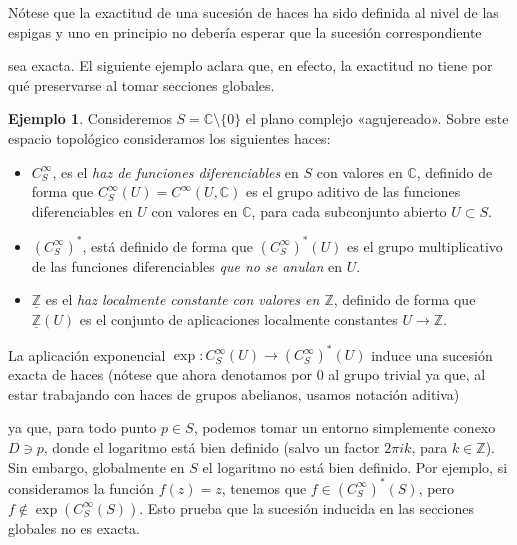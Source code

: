 \documentclass[autocontact]{gaceta}
\theoremstyle{definition} \newtheorem{defn}[thm]{Definición}
\theoremstyle{definition} \newtheorem{ejemplo}[thm]{Ejemplo}
\theoremstyle{definition} \newtheorem{ejercicio}[thm]{Ejercicio}
\def\CC{\mathbb{C}}
\def\FF{\mathscr{F}}
\def\GG{\mathscr{G}}
\def\HH{\mathscr{H}}
\begin{document}
      Nótese que la exactitud de una sucesión de haces ha sido definida al nivel de las espigas y uno en principio no debería esperar que la sucesión correspondiente
      \begin{center}
      \end{center}
      sea exacta. El siguiente ejemplo aclara que, en efecto, la exactitud no tiene por qué preservarse al tomar secciones globales.

    \begin{ejemplo}
      Consideremos $S=\CC\setminus \{0\}$ el plano complejo «agujereado». Sobre este espacio topológico consideramos los siguientes haces:
      \begin{itemize}
	\item $C^\infty_S$, es el \emph{haz de funciones diferenciables} en $S$ con valores en $\CC$, definido de forma que $C^\infty_S(U)=C^\infty(U,\CC)$ es el grupo aditivo de las funciones diferenciables en $U$ con valores en $\CC$, para cada subconjunto abierto $U\subset S$.
	\item $(C^\infty_S)^*$, está definido de forma que $(C^\infty_S)^*(U)$ es el grupo multiplicativo de las funciones diferenciables \emph{que no se anulan} en $U$.
	\item $\underline{\mathbb{Z}}$ es el \emph{haz localmente constante con valores en $\mathbb{Z}$}, definido de forma que $\underline{\mathbb{Z}}(U)$ es el conjunto de aplicaciones localmente constantes $U\rightarrow \mathbb{Z}$.
      \end{itemize}
      La aplicación exponencial $\exp:C^\infty_S(U) \rightarrow (C^\infty_S)^*(U)$ induce una sucesión exacta de haces (nótese que ahora denotamos por $0$ al grupo trivial ya que, al estar trabajando con haces de grupos abelianos, usamos notación aditiva)
      \begin{center}
      \end{center}
      ya que, para todo punto $p\in S$, podemos tomar un entorno simplemente conexo $D\ni p$, donde el logaritmo está bien definido (salvo un factor $2\pi i k$, para $k\in \mathbb{Z}$). Sin embargo, globalmente en $S$ el logaritmo no está bien definido. Por ejemplo, si consideramos la función $f(z)=z$, tenemos que $f\in (C^\infty_S)^*(S)$, pero $f\not \in \exp(C^\infty_S(S))$. Esto prueba que la sucesión inducida en las secciones globales no es exacta.
    \end{ejemplo}
    
\end{document}
